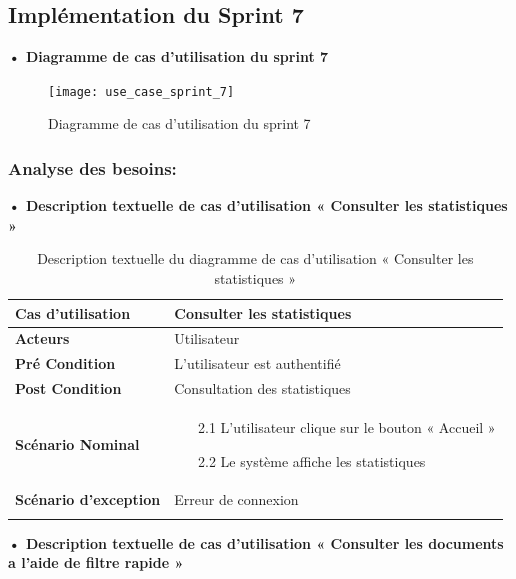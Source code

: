 \subsection{Implémentation du Sprint 7}
\textbf{•	Diagramme de cas d'utilisation du sprint 7}

\begin{figure}[H]
  \centering
  \texttt{[image: use\_case\_sprint\_7]}
  \caption{Diagramme de cas d'utilisation du sprint 7}
  \label{fig:UseCaseDiagramSp71}
\end{figure}

\subsubsection{Analyse des besoins:}
\textbf{•	Description textuelle de cas d'utilisation « Consulter les statistiques »}

\begin{longtable}{|p{5cm}|p{10cm}|}
\hline
\textbf{Cas d'utilisation}&Consulter les statistiques\\
\hline
\textbf{Acteurs}&Utilisateur\\
\hline
\textbf{Pré Condition}&L'utilisateur est authentifié\\
\hline
\textbf{Post Condition}&Consultation des statistiques\\
\hline
\textbf{Scénario Nominal}&
\vspace{-\baselineskip}
\begin{enumerate}
  \setcounter{enumi}{1}
      \item [2.1] L'utilisateur clique sur le bouton « Accueil »
      \item [2.2] Le système affiche les statistiques
\end{enumerate}\\
\hline
\textbf{Scénario d'exception}&Erreur de connexion\\
\hline
\caption{Description textuelle du diagramme de cas d'utilisation « Consulter les statistiques »}
\label{tab:use_case_consulter_statistiques}
\end{longtable}

\textbf{•	Description textuelle de cas d'utilisation « Consulter les documents a l'aide de filtre rapide »}

